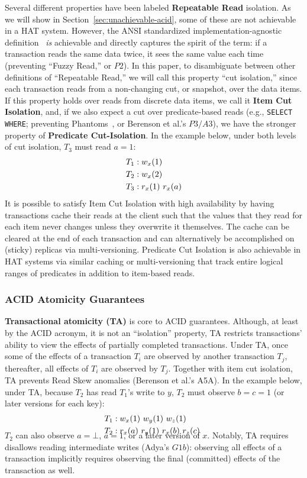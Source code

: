Several different properties have been labeled \textbf{Repeatable
  Read} isolation. As we will show in
Section~\ref{sec:unachievable-acid}, some of these are not achievable
in a HAT system. However, the ANSI standardized
implementation-agnostic definition~\cite{ansi-sql} \textit{is}
achievable and directly captures the spirit of the term: if a
transaction reads the same data twice, it sees the same value each
time (preventing ``Fuzzy Read,'' or $P2$). In this paper, to
disambiguate between other definitions of ``Repeatable Read,'' we will
call this property ``cut isolation,'' since each transaction reads
from a non-changing cut, or snapshot, over the data items. If this
property holds over reads from discrete data items, we call it
\textbf{Item Cut Isolation}, and, if we also expect a cut over
predicate-based reads (e.g., \texttt{SELECT WHERE}; preventing
Phantoms~\cite{gray-isolation}, or Berenson et al.'s $P3/A3$), we have
the stronger property of \textbf{Predicate Cut-Isolation}. In the
example below, under both levels of cut isolation, $T_3$ must read
$a=1$:
\begin{align*}
\small
T_1 &: w_x(1)
\\T_2 &: w_x(2)
\\T_3 &: r_x(1)~r_x(a)
\end{align*}
It is possible to satisfy Item Cut Isolation with high availability by
having transactions cache their reads at the client such that the
values that they read for each item never changes unless they
overwrite it themselves. The cache can be cleared at the end of each
transaction and can alternatively be accomplished on (sticky) replicas
via multi-versioning. Predicate Cut Isolation is also achievable in
HAT systems via similar caching or multi-versioning that track entire
logical ranges of predicates in addition to item-based reads.

\subsubsection{ACID Atomicity Guarantees}
\label{sec:ta}

\textbf{Transactional atomicity (TA)} is core to ACID
guarantees. Although, at least by the ACID acronym, it is not an
``isolation'' property, TA restricts transactions' ability to view the
effects of partially completed transactions. Under TA, once some of
the effects of a transaction $T_i$ are observed by another transaction
$T_j$, thereafter, all effects of $T_i$ are observed by
$T_j$. Together with item cut isolation, TA prevents Read Skew
anomalies (Berenson et al.'s A5A). In the example below, under TA,
because $T_2$ has read $T_1$'s write to $y$, $T_2$ must observe
$b=c=1$ (or later versions for each key):
\begin{align*}
\small
T_1 &: w_x(1)~w_y(1)~w_z(1)
\\T_2 &: r_x(a)~r_y(1)~r_x(b)~r_z(c)~\\[-1.5em]
\end{align*}
$T_2$ can also observe $a=\bot$, $a=1$, or a later version of
$x$. Notably, TA requires disallows reading intermediate writes
(Adya's $G1b$): observing all effects of a transaction implicitly
requires observing the final (committed) effects of the transaction as
well.

